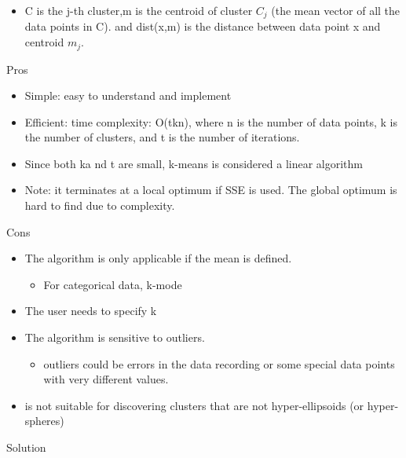\documentclass[
]{book}
\providecommand{\tightlist}{%
  \setlength{\itemsep}{0pt}\setlength{\parskip}{0pt}}
\begin{document}
\begin{itemize}
\tightlist
\item
  C is the j-th cluster,m is the centroid of cluster \(C_j\) (the mean vector of all the data points in C). and dist(x,m) is the distance between data point x and centroid \(m_j\).
\end{itemize}

Pros

\begin{itemize}
\tightlist
\item
  Simple: easy to understand and implement
\item
  Efficient: time complexity: O(tkn), where n is the number of data points, k is the number of clusters, and t is the number of iterations.
\item
  Since both ka nd t are small, k-means is considered a linear algorithm
\item
  Note: it terminates at a local optimum if SSE is used. The global optimum is hard to find due to complexity.
\end{itemize}

Cons

\begin{itemize}
\item
  The algorithm is only applicable if the mean is defined.

  \begin{itemize}
  \tightlist
  \item
    For categorical data, k-mode
  \end{itemize}
\item
  The user needs to specify k
\item
  The algorithm is sensitive to outliers.

  \begin{itemize}
  \tightlist
  \item
    outliers could be errors in the data recording or some special data points with very different values.
  \end{itemize}
\item
  is not suitable for discovering clusters that are not hyper-ellipsoids (or hyper-spheres)
\end{itemize}

Solution
\end{document}
